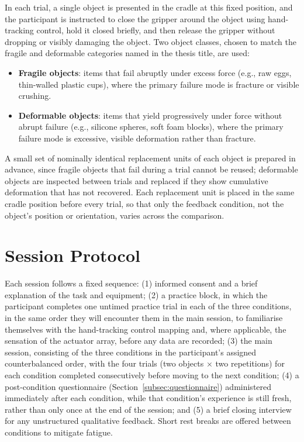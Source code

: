 \documentclass[12pt, a4paper]{report}
\begin{document}
In each trial, a single object is presented in the cradle at this fixed position, and the participant is instructed to close the gripper around the object using hand-tracking control, hold it closed briefly, and then release the gripper without dropping or visibly damaging the object. Two object classes, chosen to match the fragile and deformable categories named in the thesis title, are used:
\begin{itemize}
    \item \textbf{Fragile objects}: items that fail abruptly under excess force (e.g., raw eggs, thin-walled plastic cups), where the primary failure mode is fracture or visible crushing.
    \item \textbf{Deformable objects}: items that yield progressively under force without abrupt failure (e.g., silicone spheres, soft foam blocks), where the primary failure mode is excessive, visible deformation rather than fracture.
\end{itemize}
A small set of nominally identical replacement units of each object is prepared in advance, since fragile objects that fail during a trial cannot be reused; deformable objects are inspected between trials and replaced if they show cumulative deformation that has not recovered. Each replacement unit is placed in the same cradle position before every trial, so that only the feedback condition, not the object's position or orientation, varies across the comparison.

\section{Session Protocol}
\label{sec:sessionprotocol}
Each session follows a fixed sequence: (1) informed consent and a brief explanation of the task and equipment; (2) a practice block, in which the participant completes one untimed practice trial in each of the three conditions, in the same order they will encounter them in the main session, to familiarise themselves with the hand-tracking control mapping and, where applicable, the sensation of the actuator array, before any data are recorded; (3) the main session, consisting of the three conditions in the participant's assigned counterbalanced order, with the four trials (two objects $\times$ two repetitions) for each condition completed consecutively before moving to the next condition; (4) a post-condition questionnaire (Section~\ref{subsec:questionnaire}) administered immediately after each condition, while that condition's experience is still fresh, rather than only once at the end of the session; and (5) a brief closing interview for any unstructured qualitative feedback. Short rest breaks are offered between conditions to mitigate fatigue.
\end{document}
